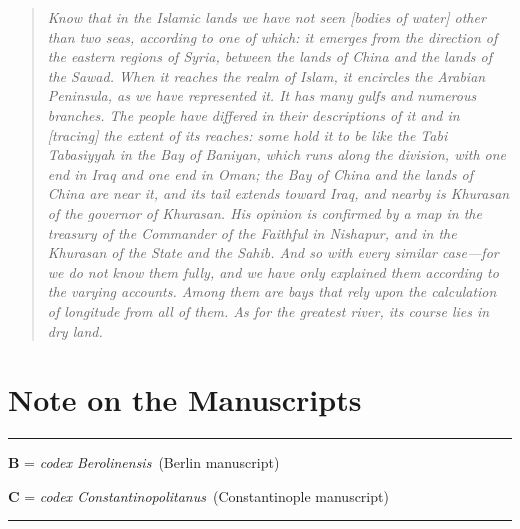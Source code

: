 \documentclass[11pt,a4paper]{article}
\newcommand{\codB}{\textit{codex Berolinensis}}
\newcommand{\codC}{\textit{codex Constantinopolitanus}}
\begin{document}
\bigskip

\begin{quote}
\small
\textit{Know that in the Islamic lands we have not seen [bodies of water] other than two seas, according to one of which: it emerges from the direction of the eastern regions of Syria, between the lands of China and the lands of the Sawad. When it reaches the realm of Islam, it encircles the Arabian Peninsula, as we have represented it. It has many gulfs and numerous branches. The people have differed in their descriptions of it and in [tracing] the extent of its reaches: some hold it to be like the Tabi Tabasiyyah in the Bay of Baniyan, which runs along the division, with one end in Iraq and one end in Oman; the Bay of China and the lands of China are near it, and its tail extends toward Iraq, and nearby is Khurasan of the governor of Khurasan. His opinion is confirmed by a map in the treasury of the Commander of the Faithful in Nishapur, and in the Khurasan of the State and the Sahib. And so with every similar case---for we do not know them fully, and we have only explained them according to the varying accounts. Among them are bays that rely upon the calculation of longitude from all of them. As for the greatest river, its course lies in dry land.}
\end{quote}

\clearpage


\section*{Note on the Manuscripts}

\begin{center}
\rule{0.5\textwidth}{0.6pt}
\end{center}

\vspace{0.5cm}

\textbf{B} = \codB\ (Berlin manuscript)

\textbf{C} = \codC\ (Constantinople manuscript)

\vspace{0.5cm}

\begin{center}
\rule{0.5\textwidth}{0.6pt}
\end{center}
\end{document}
